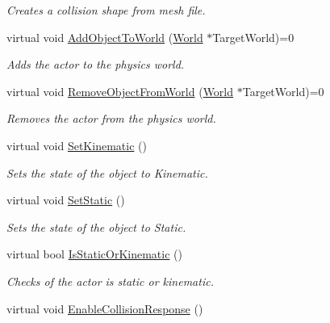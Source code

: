 \begin{DoxyCompactItemize}
\begin{DoxyCompactList}\small\item\em Creates a collision shape from mesh file. \item\end{DoxyCompactList}\item 
virtual void \hyperlink{classphys_1_1ActorBase_a3d28e4c4a33f50210101695cb33ded3b}{AddObjectToWorld} (\hyperlink{classphys_1_1World}{World} $\ast$TargetWorld)=0
\begin{DoxyCompactList}\small\item\em Adds the actor to the physics world. \item\end{DoxyCompactList}\item 
virtual void \hyperlink{classphys_1_1ActorBase_aaa787de7ec5d7d1d8428ea78f37bcb40}{RemoveObjectFromWorld} (\hyperlink{classphys_1_1World}{World} $\ast$TargetWorld)=0
\begin{DoxyCompactList}\small\item\em Removes the actor from the physics world. \item\end{DoxyCompactList}\item 
virtual void \hyperlink{classphys_1_1ActorBase_acd5613286ec14fb2a8e5ed5f5003dc5f}{SetKinematic} ()
\begin{DoxyCompactList}\small\item\em Sets the state of the object to Kinematic. \item\end{DoxyCompactList}\item 
virtual void \hyperlink{classphys_1_1ActorBase_af0219532fe71d1d84042a20a88fe5037}{SetStatic} ()
\begin{DoxyCompactList}\small\item\em Sets the state of the object to Static. \item\end{DoxyCompactList}\item 
virtual bool \hyperlink{classphys_1_1ActorBase_a0758873d315a0f70871649493d78d739}{IsStaticOrKinematic} ()
\begin{DoxyCompactList}\small\item\em Checks of the actor is static or kinematic. \item\end{DoxyCompactList}\item 
virtual void \hyperlink{classphys_1_1ActorBase_a843f60f15435071c08d3cf2480f0ffeb}{EnableCollisionResponse} ()

\end{DoxyCompactItemize}
